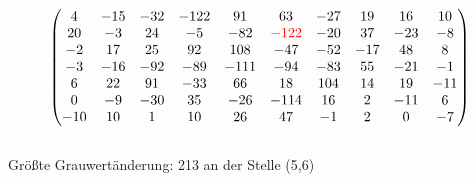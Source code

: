 \documentclass[aspectratio=169]{beamer}
\begin{document}
\begin{frame}
\begin{columns}
\begin{column}{0.6\textwidth}
\begin{alertblock}
\begin{tiny}
\begin{equation*}
\begin{pmatrix}
                   4 & -15 & -32 & -122 &   91 &   63 & -27 &  19 &  16 &  10 \\
                   20 &  -3 &  24 &   -5 &  -82 & \textcolor{red}{-122} & -20 &  37 & -23 &  -8 \\
                  -2 &  17 &  25 &   92 &  108 &  -47 & -52 & -17 &  48 &   8 \\
                  -3 & -16 & -92 &  -89 & -111 &  -94 & -83 &  55 & -21 &  -1 \\
                   6 &  22 &  91 &  -33 &   66 &   18 & 104 &  14 &  19 & -11 \\
                   0 &  -9 & -30 &   35 &  -26 & -114 &  16 &   2 & -11 &   6 \\
                 -10 &  10 &   1 &   10 &   26 &   47 &  -1 &   2 &   0 &  -7 \\
            \end{pmatrix}
        \end{equation*}
        \end{tiny}
    \end{alertblock}
    \end{column}
    \end{columns}
    \begin{alertblock}
        {Größte Grauwertänderung:}
        213 an der Stelle (5,6)
    \end{alertblock}
\end{frame}
\end{document}
